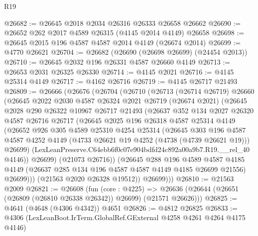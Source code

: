 \begin{lexlean}{R19}
\begin{coremodule}
@26682 := @26645 @2018 @2034 @26316 @26333 @26658 @26662
@26690 := @26652 @262 @2017 @4589 @26315 (@4145 @2014 @4149) @26658
@26698 := @26645 @2015 @196 @4587 @4587 @2014 @4149 (@26674 @2014)
@26699 := @4770 @26621
@26704 := @26682 (@26690 (@26698 @26699) (@24454 @2013))
@26710 := @26645 @2032 @196 @26331 @4587 @26660 @4149
@26713 := @26653 @2031 @26325 @26330
@26714 := @4145 @2021
@26716 := @4145 @25314 @4149
@26717 := @4162 @26716
@26719 := @4145 @26717 @21493
@26809 := @26666
    (@26676
      (@26704
        (@26710
          (@26713
            (@26714 @26719)
            @26660
            (@26645
              @2022
              @2030
              @4587
              @26324
              @2021
              @26719
              (@26674 @2021)
              (@26645
                @2028
                @290
                @26322
                @10967
                @26717
                @21493
                (@26637
                  @352
                  @134
                  @2027
                  @26320
                  @4587
                  @26716
                  @26717
                  (@26645
                    @2025
                    @196
                    @26318
                    @4587
                    @25314
                    @4149
                    (@26652
                      @926
                      @305
                      @4589
                      @25310
                      @4254
                      @25314
                      (@26645
                        @303
                        @196
                        @4587
                        @4587
                        @4252
                        @4149
                        (@4733 @26621 @19 @4252 (@4738 (@4739 @26621 @19)))
                        @26699)
                      (LexLeanPreserve.C64ebb6f0c07e904bdfd24c892a00a9b7.R19.__rel_40 @4146))
                    @26699)
                  (@21073 @26716))
                (@26645
                  @288
                  @196
                  @4589
                  @4587
                  @4185
                  @4149
                  (@26637 @285 @134 @196 @4587 @4587 @4149 @4185 @26699 @21556)
                  @26699)))
            (@21563 @2020 @26328 @19512))
          @26699)))
@26810 := @21563 @2009
@26821 := @26608
    (fun (core : @4225) =>
    @26636 (@26644 (@26651 (@26809 (@26810 @26338 @26342)) @26699) (@21571 @26626)))
@26825 := @4641 (@4648 (@4306 @4342)) @4651
@26826 := @4812 @26825
@26833 := @4306 (LexLeanBoot.IrTerm.GlobalRef.GExternal @4258 @4261 @4264 @4175 @4146)

\end{coremodule}
\end{lexlean}
